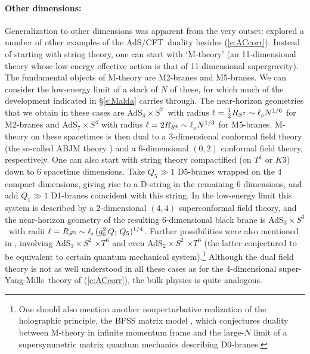 \documentclass[12pt,a4paper]{article}
\def\sect#1{\S\ref{#1}}
\def\req#1{(\ref{#1})}
\def\AC{AdS/CFT}
\def\SYM{super-Yang-Mills}
\def\lpl{\ell_{\scriptscriptstyle {\rm p}}}
\def\lst{\ell_{\scriptscriptstyle {\rm s}}}
\def\adss#1#2{AdS$_{#1} \times S^{#2}$}
\def\Rads{\ell}
\begin{document}
\paragraph{Other dimensions:}  %
Generalization to other dimensions was apparent from the very outset:  \cite{Maldacena:1997re} explored a number of other examples of the \AC\ duality besides \req{e:ACcorr}.  
Instead of starting with  string theory, one can start with `M-theory' (an 11-dimensional theory whose low-energy effective action is that of 11-dimensional supergravity).  The fundamental objects of M-theory are M2-branes and M5-branes.  We can consider the low-energy limit of a stack of $N$ of these, for which much of the development indicated in \sect{s:Malda} carries through.   The near-horizon geometries that we obtain in these cases are \adss47\ with radius $\Rads = \frac{1}{2} R_{S^7} \sim \lpl N^{1/6}$ for M2-branes and \adss74  with radius $\Rads = 2 R_{S^4} \sim \lpl N^{1/3}$  for M5-branes.   M-theory on these spacetimes is then dual to a 3-dimensional conformal field theory
 (the so-called ABJM theory \cite{Aharony:2008ug}) and a 6-dimensional $(0,2)$ conformal field theory, respectively.
One can also start with string theory compactified (on $T^4$ or $K3$) down to 6 spacetime dimensions.  Take $Q_5 \gg 1$ D5-branes wrapped on the 4 compact dimensions, giving rise to a D-string in the remaining 6 dimensions, and add $Q_1 \gg 1$ D1-branes coincident with this string.  In the low-energy limit this system is described by a 2-dimensional $(4,4)$ superconformal field theory, and the near-horizon geometry of the resulting 6-dimensional black brane is \adss33\ with radii $\Rads = R_{S^3} \sim \lst\, (g_6^2 \, Q_1 \, Q_5)^{1/4}$.  Further possibilities were also mentioned in \cite{Maldacena:1997re}, involving \adss32 $\times T^6$ and even  \adss22 $\times T^6$ (the latter conjectured to be equivalent to certain quantum mechanical system).\footnote{
One should also mention another nonperturbative realization of the holographic principle, the BFSS matrix model \cite{Banks:1996vh}, which conjectures duality between M-theory in infinite momentum frame and the large-$N$ limit of a supersymmetric matrix quantum mechanics describing D0-branes.
}
Although the dual field theory is not as well understood in all these cases as for the 4-dimensional \SYM\ theory of \req{e:ACcorr}, the bulk physics is quite analogous.
\end{document}
